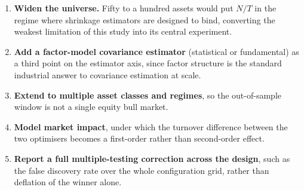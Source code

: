 \begin{enumerate}[noitemsep]
  \item \textbf{Widen the universe.} Fifty to a hundred assets would put $N/T$ in
  the regime where shrinkage estimators are designed to bind, converting the
  weakest limitation of this study into its central experiment.
  \item \textbf{Add a factor-model covariance estimator} (statistical or
  fundamental) as a third point on the estimator axis, since factor structure is
  the standard industrial answer to covariance estimation at scale.
  \item \textbf{Extend to multiple asset classes and regimes}, so the
  out-of-sample window is not a single equity bull market.
  \item \textbf{Model market impact}, under which the turnover difference between
  the two optimisers becomes a first-order rather than second-order effect.
  \item \textbf{Report a full multiple-testing correction across the design}, such
  as the false discovery rate over the whole configuration grid, rather than
  deflation of the winner alone.
\end{enumerate}
